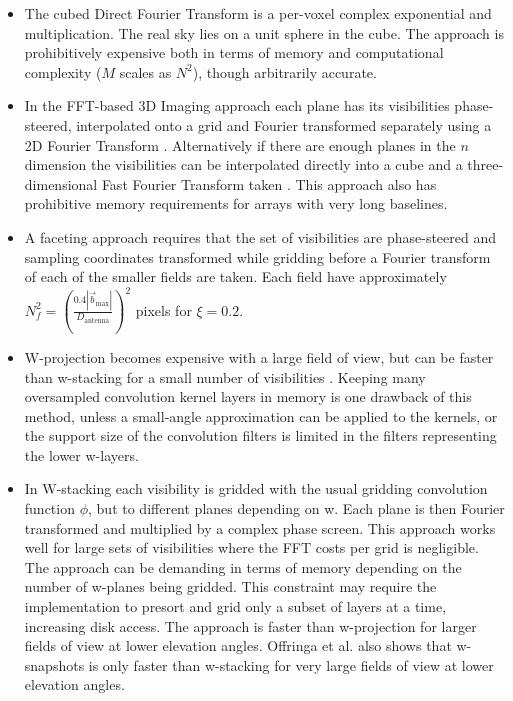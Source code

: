 \begin{itemize}
 \item The cubed Direct Fourier Transform is a per-voxel complex exponential and multiplication. The real sky lies on a unit sphere in the cube. The approach is prohibitively expensive both
in terms of memory and computational complexity ($M$ scales as $N^2$), though arbitrarily accurate. 

 \item In the FFT-based 3D Imaging approach each plane has its visibilities phase-steered, interpolated onto a grid and Fourier transformed separately using a 2D Fourier Transform \cite[Lecture 19]{taylor1999synthesis}. 
Alternatively if there are enough planes in the $n$ dimension the visibilities can be interpolated directly into a cube and a three-dimensional Fast Fourier Transform taken \cite{yashar2009tdp}. This approach also has 
prohibitive memory requirements for arrays with very long baselines.

 \item A faceting approach requires that the set of visibilities are phase-steered and sampling coordinates transformed while gridding before a Fourier transform of each of the smaller fields are taken. Each 
 field have approximately $N_f^2=\left(\frac{0.4|\vec{b}_\text{max}|}{D_\text{antenna}}\right)^2$ pixels for $\xi=0.2$.

 \item W-projection becomes expensive with a large field of view, but can be faster than w-stacking for a small number of visibilities \cite{offringa2014wsclean}. Keeping many oversampled 
 convolution kernel layers in memory is one drawback of this method, unless a small-angle approximation can be applied to the kernels, or the support size of the convolution filters is limited in 
 the filters representing the lower w-layers.

 \item In W-stacking each visibility is gridded with the usual gridding convolution function $\phi$, but to different planes depending on w. Each plane is then Fourier transformed and 
multiplied by a complex phase screen. This approach works well for large sets of visibilities where the FFT costs per grid is negligible. The approach can be demanding in terms of memory depending
on the number of w-planes being gridded. This constraint may require the implementation to presort and grid only a subset of layers at a time, increasing disk access. The approach is faster than w-projection
for larger fields of view at lower elevation angles. Offringa et al. \cite{offringa2014wsclean} also shows that w-snapshots is only faster than w-stacking for very large fields of view at lower elevation angles.
\end{itemize}


